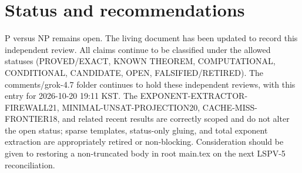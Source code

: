 \documentclass[11pt]{article}
\begin{document}
\section{Status and recommendations}
P versus NP remains open. The living document has been updated to record this independent review. All claims continue to be classified under the allowed statuses (PROVED/EXACT, KNOWN THEOREM, COMPUTATIONAL, CONDITIONAL, CANDIDATE, OPEN, FALSIFIED/RETIRED). The comments/grok-4.7 folder continues to hold these independent reviews, with this entry for 2026-10-20 19:11 KST. The EXPONENT-EXTRACTOR-FIREWALL21, MINIMAL-UNSAT-PROJECTION20, CACHE-MISS-FRONTIER18, and related recent results are correctly scoped and do not alter the open status; sparse templates, status-only gluing, and total exponent extraction are appropriately retired or non-blocking. Consideration should be given to restoring a non-truncated body in root main.tex on the next LSPV-5 reconciliation.

\end{document}

